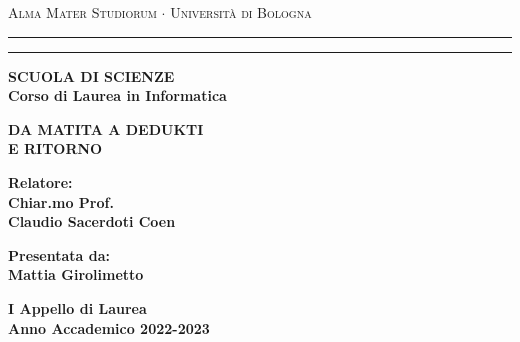 \documentclass[12pt,a4paper]{report}
\begin{document}
\begin{titlepage}
  \begin{center}
    {{
      \Large{\textsc{Alma Mater Studiorum $\cdot$ Universit\`a di Bologna}}
    }} \rule[0.1cm]{15.8cm}{0.1mm}
    \rule[0.5cm]{15.8cm}{0.6mm}
    {\small{\bf SCUOLA DI SCIENZE\\
    Corso di Laurea in Informatica}}
  \end{center}
  \vspace{15mm}
  \begin{center}
    {\LARGE{\bf DA MATITA A DEDUKTI}}\\
    \vspace{3mm}
    {\LARGE{\bf E RITORNO}}\\
  \end{center}
  \vspace{40mm}
  \par
  \noindent
  \begin{minipage}[t]{0.47\textwidth}
  {\large{\bf Relatore:\\
  Chiar.mo Prof.\\ %
  Claudio Sacerdoti Coen}}
  \end{minipage}
  \hfill
  \begin{minipage}[t]{0.47\textwidth}\raggedleft
  {\large{\bf Presentata da:\\
  Mattia Girolimetto}}
  \end{minipage}
  \vspace{20mm}
  \begin{center}
  {\large{\bf I Appello di Laurea\\%
  Anno Accademico 2022-2023}}%
  \end{center}
\end{titlepage}


\begin{abstract}
\end{abstract}

\tableofcontents
\end{document}
